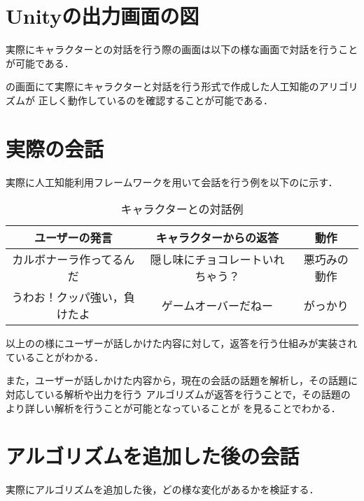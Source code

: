 
\section{Unityの出力画面の図}
実際にキャラクターとの対話を行う際の画面は以下の様な画面で対話を行うことが可能である．


の画面にて実際にキャラクターと対話を行う形式で作成した人工知能のアリゴリズムが
正しく動作しているのを確認することが可能である．


\section{実際の会話}
実際に人工知能利用フレームワークを用いて会話を行う例を以下のに示す．

\begin{table}[tbh]
	\caption{キャラクターとの対話例} \label{tab:Chat}
	\begin{center}
		\begin{tabular}[htb]{c|c|c}
		\hline
		ユーザーの発言 & キャラクターからの返答 & 動作 \\
		\hline
		カルボナーラ作ってるんだ & 隠し味にチョコレートいれちゃう？ & 悪巧みの動作 \\
		うわお！クッパ強い，負けたよ & ゲームオーバーだねー & がっかり \\
		\hline
		\end{tabular}
	\end{center}
\end{table}

以上のの様にユーザーが話しかけた内容に対して，返答を行う仕組みが実装されていることがわかる．

また，ユーザーが話しかけた内容から，現在の会話の話題を解析し，その話題に対応している解析や出力を行う
アルゴリズムが返答を行うことで，その話題のより詳しい解析を行うことが可能となっていることが
を見ることでわかる．


\section{アルゴリズムを追加した後の会話}\label{sec:addAl}
実際にアルゴリズムを追加した後，どの様な変化があるかを検証する．

